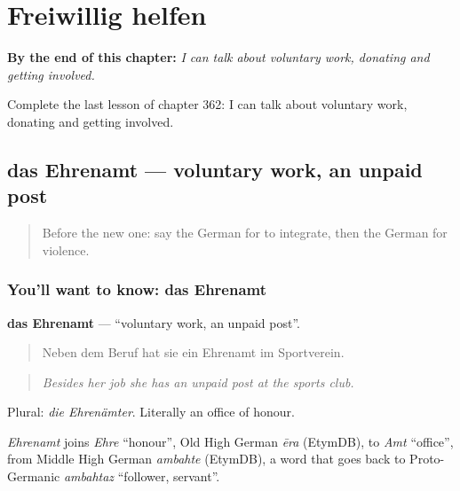 
\chapter{Freiwillig helfen}
\label{ch:ge-freiwillig-helfen}

\begin{chapteropening}
\textbf{By the end of this chapter:} \emph{I can talk about voluntary work, donating and getting involved.}

Complete the last lesson of chapter 362: I can talk about voluntary work, donating and getting involved.
\end{chapteropening}

\section[das Ehrenamt]{das Ehrenamt — voluntary work, an unpaid post}

\label{lesson:GE-C362-ehrenamt}



\begin{quote}
Before the new one: say the German for to integrate, then the German for violence.
\end{quote}

\subsection*{You'll want to know: das Ehrenamt}
\textbf{das Ehrenamt} — \textquotedblleft{}voluntary work, an unpaid post\textquotedblright{}.

\begin{quote}
Neben dem Beruf hat sie ein Ehrenamt im Sportverein.
\end{quote}

\begin{quote}
\emph{Besides her job she has an unpaid post at the sports club.}
\end{quote}

Plural: \emph{die Ehrenämter}. Literally an office of honour.

\begin{cousinweb}
\emph{Ehrenamt} joins \emph{Ehre} \textquotedblleft{}honour\textquotedblright{}, Old High German \emph{ēra} (EtymDB), to \emph{Amt} \textquotedblleft{}office\textquotedblright{}, from Middle High German \emph{ambahte} (EtymDB), a word that goes back to Proto-Germanic \emph{ambahtaz} \textquotedblleft{}follower, servant\textquotedblright{}.
\end{cousinweb}

